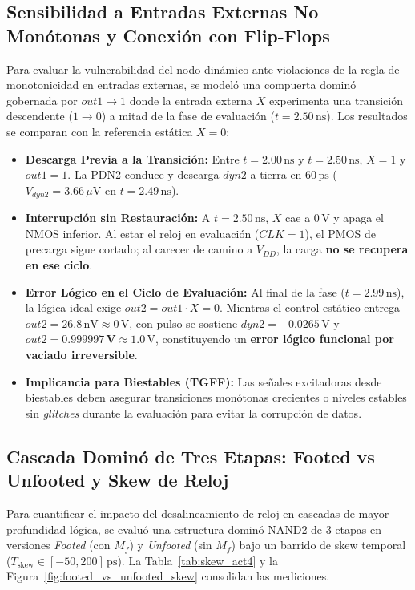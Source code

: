 \subsection{Sensibilidad a Entradas Externas No Monótonas y Conexión con Flip-Flops}
Para evaluar la vulnerabilidad del nodo dinámico ante violaciones de la regla de monotonicidad en entradas externas, se modeló una compuerta dominó gobernada por $out1 \to 1$ donde la entrada externa $X$ experimenta una transición descendente ($1 \to 0$) a mitad de la fase de evaluación ($t = 2.50\,\text{ns}$). Los resultados se comparan con la referencia estática $X=0$:

\begin{itemize}[leftmargin=1.4em,itemsep=0.01em]
  \item \textbf{Descarga Previa a la Transición:} Entre $t=2.00\,\text{ns}$ y $t=2.50\,\text{ns}$, $X=1$ y $out1=1$. La PDN2 conduce y descarga $dyn2$ a tierra en $60\,\text{ps}$ ($V_{dyn2} = 3.66\,\mu\text{V}$ en $t=2.49\,\text{ns}$).
  \item \textbf{Interrupción sin Restauración:} A $t=2.50\,\text{ns}$, $X$ cae a $0\,\text{V}$ y apaga el NMOS inferior. Al estar el reloj en evaluación ($CLK=1$), el PMOS de precarga sigue cortado; al carecer de camino a $V_{DD}$, la carga \textbf{no se recupera en ese ciclo}.
  \item \textbf{Error Lógico en el Ciclo de Evaluación:} Al final de la fase ($t=2.99\,\text{ns}$), la lógica ideal exige $out2 = out1 \cdot X = 0$. Mientras el control estático entrega $out2 = 26.8\,\text{nV} \approx 0\,\text{V}$, con pulso se sostiene $dyn2 = -0.0265\,\text{V}$ y $out2 = \mathbf{0.999997\,\text{V}} \approx 1.0\,\text{V}$, constituyendo un \textbf{error lógico funcional por vaciado irreversible}.
  \item \textbf{Implicancia para Biestables (TGFF):} Las señales excitadoras desde biestables deben asegurar transiciones monótonas crecientes o niveles estables sin \textit{glitches} durante la evaluación para evitar la corrupción de datos.
\end{itemize}

\subsection{Cascada Dominó de Tres Etapas: Footed vs Unfooted y Skew de Reloj}
Para cuantificar el impacto del desalineamiento de reloj en cascadas de mayor profundidad lógica, se evaluó una estructura dominó NAND2 de 3 etapas en versiones \textit{Footed} (con $M_f$) y \textit{Unfooted} (sin $M_f$) bajo un barrido de skew temporal ($T_{\text{skew}} \in [-50, 200]\,\text{ps}$). La Tabla~\ref{tab:skew_act4} y la Figura~\ref{fig:footed_vs_unfooted_skew} consolidan las mediciones.

